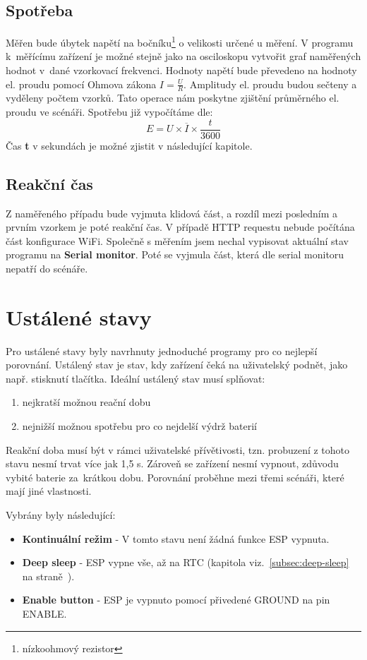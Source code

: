 \documentclass[a4paper, 12pt]{report}
\begin{document}
    \subsection{Spotřeba}
    \label{subsec:wifi-spotreba}
    Měřen bude úbytek napětí na bočníku\footnote{nízkoohmový rezistor} o velikosti určené u měření.
    V programu k~měřícímu zařízení je možné stejně jako na osciloskopu vytvořit graf naměřených hodnot v~dané vzorkovací frekvenci.
    Hodnoty napětí bude převedeno na hodnoty el. proudu pomocí Ohmova zákona $I = \frac{U}{R}$.
    Amplitudy el. proudu budou sečteny a vyděleny počtem vzorků.
    Tato operace nám poskytne zjištění průměrného el. proudu ve scénáři.
    Spotřebu již vypočítáme dle:
    \[E = U \times \overline{I} \times \frac{t}{3600}\]
    Čas \textbf{t} v sekundách je možné zjistit v následující kapitole.

    \subsection{Reakční čas}
    \label{subsec:wifi-reakce}
    Z naměřeného případu bude vyjmuta klidová část, a rozdíl mezi posledním a prvním vzorkem je poté reakční čas.
    V případě HTTP requestu nebude počítána část konfigurace WiFi.
    Společně s měřením jsem nechal vypisovat aktuální stav programu na \textbf{Serial monitor}.
    Poté se vyjmula část, která dle serial monitoru nepatří do scénáře.


    \section{Ustálené stavy}
    Pro ustálené stavy byly navrhnuty jednoduché programy pro co nejlepší porovnání.
    Ustálený stav je stav, kdy zařízení čeká na uživatelský podnět, jako např. stisknutí tlačítka.
    Ideální ustálený stav musí splňovat:
    \begin{enumerate}
        \item nejkratší možnou reační dobu
        \item nejnižší možnou spotřebu pro co nejdelší výdrž baterií
    \end{enumerate}
    Reakční doba musí být v rámci uživatelské přívětivosti, tzn. probuzení z tohoto stavu nesmí trvat více jak 1,5 \si{s}.
    Zároveň se zařízení nesmí vypnout, zdůvodu vybité baterie za~krátkou dobu. Porovnání proběhne mezi třemi scénáři, které mají jiné vlastnosti. \par
    Vybrány byly následující:
    \begin{itemize}
        \item \textbf{Kontinuální režim} - V tomto stavu není žádná funkce ESP vypnuta.
        \item \textbf{Deep sleep} - ESP vypne vše, až na RTC (kapitola viz.~\ref{subsec:deep-sleep} na straně~\pageref{subsec:deep-sleep}).
        \item \textbf{Enable button} - ESP je vypnuto pomocí přivedené GROUND na pin ENABLE\@.
    \end{itemize}
\end{document}
